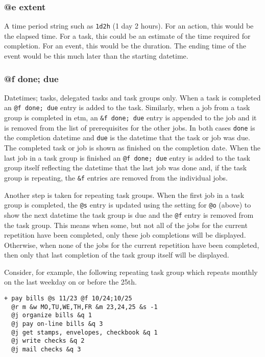 \documentclass[]{article}
\begin{document}
\subsubsection{@e extent}

A time period string such as \texttt{1d2h} (1 day 2 hours). For an
action, this would be the elapsed time. For a task, this could be an
estimate of the time required for completion. For an event, this would
be the duration. The ending time of the event would be this much later
than the starting datetime.

\subsubsection{@f done; due}

Datetimes; tasks, delegated tasks and task groups only. When a task is
completed an \texttt{@f done; due} entry is added to the task.
Similarly, when a job from a task group is completed in etm, an
\texttt{\&f done; due} entry is appended to the job and it is removed
from the list of prerequisites for the other jobs. In both cases
\texttt{done} is the completion datetime and \texttt{due} is the
datetime that the task or job was due. The completed task or job is
shown as finished on the completion date. When the last job in a task
group is finished an \texttt{@f done; due} entry is added to the task
group itself reflecting the datetime that the last job was done and, if
the task group is repeating, the \texttt{\&f} entries are removed from
the individual jobs.

Another step is taken for repeating task groups. When the first job in a
task group is completed, the \texttt{@s} entry is updated using the
setting for \texttt{@o} (above) to show the next datetime the task group
is due and the \texttt{@f} entry is removed from the task group. This
means when some, but not all of the jobs for the current repetition have
been completed, only these job completions will be displayed. Otherwise,
when none of the jobs for the current repetition have been completed,
then only that last completion of the task group itself will be
displayed.

Consider, for example, the following repeating task group which repeats
monthly on the last weekday on or before the 25th.

\begin{verbatim}
+ pay bills @s 11/23 @f 10/24;10/25
  @r m &w MO,TU,WE,TH,FR &m 23,24,25 &s -1
  @j organize bills &q 1
  @j pay on-line bills &q 3
  @j get stamps, envelopes, checkbook &q 1
  @j write checks &q 2
  @j mail checks &q 3
\end{verbatim}
\end{document}
